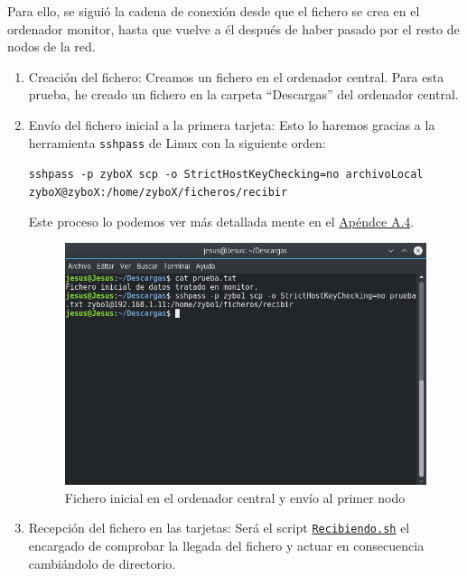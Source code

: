 Para ello, se siguió la cadena de conexión desde que el fichero se crea en el ordenador monitor, hasta que vuelve a él después de haber pasado por el resto de nodos de la red.
\begin{enumerate}
	\item Creación del fichero: Creamos un fichero en el ordenador central. Para esta prueba, he creado un fichero en la carpeta ``Descargas'' del ordenador central.

	\item Envío del fichero inicial a la primera tarjeta: Esto lo haremos gracias a la herramienta \texttt{sshpass} de Linux con la siguiente orden:
	\begin{center}
		\texttt{sshpass -p zyboX scp -o StrictHostKeyChecking=no archivoLocal zyboX@zyboX:/home/zyboX/ficheros/recibir}
	\end{center}
	Este proceso lo podemos ver más detallada mente en el \hyperlink{EnvioRecepcionFicheros}{Apéndce A.4}.
	\begin{figure}[h]
		\centering
		\includegraphics[scale=0.5]{Metodologia/Pruebas/Fichero_inicial_en_PC.png}
		\caption{Fichero inicial en el ordenador central y envío al primer nodo}
		\label{Fichero inicial en el ordenador central y envío al primer nodo}
	\end{figure}
\newpage
	\item Recepción del fichero en las tarjetas: Será el script \hyperlink{ScriptRecibiendo}{\texttt{Recibiendo.sh}} el encargado de comprobar la llegada del fichero y actuar en consecuencia cambiándolo de directorio.


\end{enumerate}
